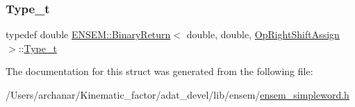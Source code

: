 \mbox{\label{structENSEM_1_1BinaryReturn_3_01double_00_01double_00_01OpRightShiftAssign_01_4_a4a608032925ea3919409492676f39f69}} 
\subsubsection{\texorpdfstring{Type\_t}{Type\_t}\hspace{0.1cm}{\footnotesize\ttfamily [2/2]}}
{\footnotesize\ttfamily typedef double \mbox{\hyperlink{structENSEM_1_1BinaryReturn}{E\+N\+S\+E\+M\+::\+Binary\+Return}}$<$ double, double, \mbox{\hyperlink{structENSEM_1_1OpRightShiftAssign}{Op\+Right\+Shift\+Assign}} $>$\+::\mbox{\hyperlink{structENSEM_1_1BinaryReturn_3_01double_00_01double_00_01OpRightShiftAssign_01_4_a4a608032925ea3919409492676f39f69}{Type\+\_\+t}}}



The documentation for this struct was generated from the following file\+:\begin{DoxyCompactItemize}
\item 
/\+Users/archanar/\+Kinematic\+\_\+factor/adat\+\_\+devel/lib/ensem/\mbox{\hyperlink{lib_2ensem_2ensem__simpleword_8h}{ensem\+\_\+simpleword.\+h}}\end{DoxyCompactItemize}
